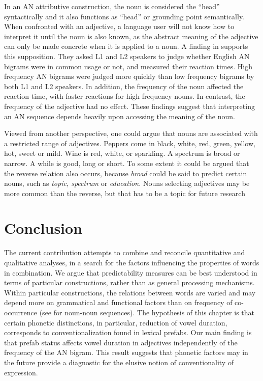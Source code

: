 \documentclass[output=paper]{langscibook}
\begin{document}
In an AN attributive construction, the noun is considered the ``head'' syntactically and it also functions as ``head'' or grounding point semantically. When confronted with an adjective, a language user will not know how to interpret it until the noun is also known, as the abstract meaning of the adjective can only be made concrete when it is applied to a noun. A finding in \citet{ÖksüzRebuschat2021} supports this supposition. They asked L1 and L2 speakers to judge whether English AN bigrams were in common usage or not, and measured their reaction times. High frequency AN bigrams were judged more quickly than low frequency bigrams by both L1 and L2 speakers. In addition, the frequency of the noun affected the reaction time, with faster reactions for high frequency nouns. In contrast, the frequency of the adjective had no effect. These findings suggest that interpreting an AN sequence depends heavily upon accessing the meaning of the noun.

Viewed from another perspective, one could argue that nouns are associated with a restricted range of adjectives. Peppers come in black, white, red, green, yellow, hot, sweet or mild. Wine is red, white, or sparkling. A spectrum is broad or narrow. A while is good, long or short. To some extent it could be argued that the reverse relation also occurs, because \textit{broad} could be said to predict certain nouns, such as \textit{topic, spectrum} or \textit{education.} Nouns selecting adjectives may be more common than the reverse, but that has to be a topic for future research

\section{Conclusion}

The current contribution attempts to combine and reconcile quantitative and qualitative analyses, in a search for the factors influencing the properties of words in combination. We argue that predictability measures can be best understood in terms of particular constructions, rather than as general processing mechanisms. Within particular constructions, the relations between words are varied and may depend more on grammatical and functional factors than on frequency of co-occurrence (see \citealt{BellPlag2012} for noun-noun sequences). The hypothesis of this chapter is that certain phonetic distinctions, in particular, reduction of vowel duration, corresponds to conventionalization found in lexical prefabs. Our main finding is that prefab status affects vowel duration in adjectives independently of the frequency of the AN bigram. This result suggests that phonetic factors may in the future provide a diagnostic for the elusive notion of conventionality of expression. 
\end{document}
